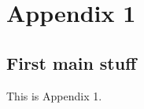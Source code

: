 \chapter{Appendix 1}
\label{ch:appendixOne}

\section{First main stuff}
\label{sec:ch_1_firstmain}

This is Appendix 1.
